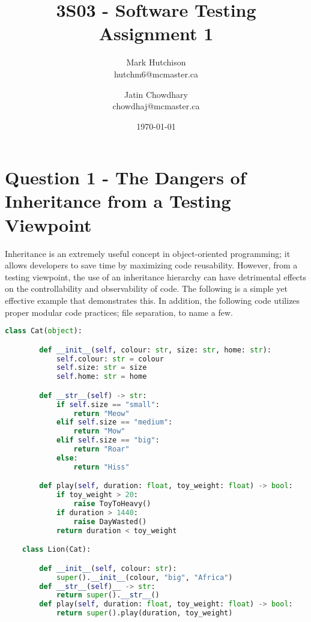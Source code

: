 \documentclass{article}
\title{3S03 - Software Testing \\
Assignment 1}
\author{Mark Hutchison \\
hutchm6@mcmaster.ca \and
Jatin Chowdhary \\
chowdhaj@mcmaster.ca}
\date{\today}
\begin{document}
\maketitle

\tableofcontents

\section{Question 1 - The Dangers of Inheritance from a Testing
Viewpoint}

Inheritance is an extremely useful concept in object-oriented
programming; it allows developers to save time by maximizing code
reusability. However, from a testing viewpoint, the use of an
inheritance hierarchy can have detrimental effects on the
controllability and observability of code. The following is a simple
yet effective example that demonstrates this. In addition, the
following code utilizes proper modular code practices; file
separation, to name a few.

\begin{lstlisting}[language=Python]
    class Cat(object):

        def __init__(self, colour: str, size: str, home: str):
            self.colour: str = colour
            self.size: str = size
            self.home: str = home

        def __str__(self) -> str:
            if self.size == "small":
                return "Meow"
            elif self.size == "medium":
                return "Mow"
            elif self.size == "big":
                return "Roar"
            else:
                return "Hiss"

        def play(self, duration: float, toy_weight: float) -> bool:
            if toy_weight > 20:
                raise ToyToHeavy()
            if duration > 1440:
                raise DayWasted()
            return duration < toy_weight

    class Lion(Cat):

        def __init__(self, colour: str):
            super().__init__(colour, "big", "Africa")
        def __str__(self)__ -> str:
            return super().__str__()
        def play(self, duration: float, toy_weight: float) -> bool:
            return super().play(duration, toy_weight)
\end{lstlisting}
\end{document}
